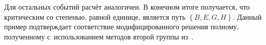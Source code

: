 Для остальных событий расчёт аналогичен. В конечном итоге получается, что критическим со степенью, равной единице, является путь $\left\{B, E, G, H \right\}$. Данный пример подтверждает соответствие модифицированного решения полному, полученному с~использованием методов второй группы из~\cite{Leondes, Dubois_Prade}.